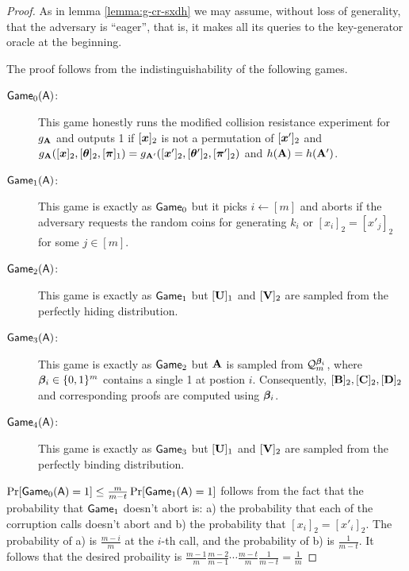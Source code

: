 \begin{proof}
As in lemma \ref{lemma:g-cr-sxdh} we may assume, without loss of generality, that the adversary is ``eager'', that is, it makes all its queries to the key-generator oracle at the beginning.

The proof follows from the indistinguishability of the following games.
\begin{description}
\item[$\mathsf{Game}_0(\mathsf{A})$:] This game honestly runs the modified collision resistance experiment for $g_{\mathbf{{A}}}$ and outputs 1 if $[{\boldsymbol{x}}]_2 $ is not a permutation of $[{\boldsymbol{x}}']_2$ and $g_{\mathbf{{A}}}([{\boldsymbol{x}}]_2,[{\boldsymbol{\theta}}]_2,[{\boldsymbol{\pi}}]_1)=g_{\mathbf{{A}}'}([{\boldsymbol{x}}']_2,[{\boldsymbol{\theta}}']_2,[{\boldsymbol{\pi}}']_2)$ and $h(\mathbf{{A}})=h(\mathbf{{A}}')$.
\item[$\mathsf{Game}_1(\mathsf{A})$:] This game is exactly as $\mathsf{Game}_0$ but it picks $i\gets[m]$ and aborts if the adversary requests the random coins for generating $k_i$ or $[x_i]_2=[x'_j]_2$ for some $j\in[m]$.
\item[$\mathsf{Game}_2(\mathsf{A})$:] This game is exactly as $\mathsf{Game}_1$ but $[\mathbf{{U}}]_1$ and $[\mathbf{{V}}]_2$ are sampled from the perfectly hiding distribution.
\item[$\mathsf{Game}_3(\mathsf{A})$:] This game is exactly as $\mathsf{Game}_2$ but $\mathbf{{A}}$ is sampled from $\mathcal{Q}_m^{{\boldsymbol{\beta}}_i}$, where ${\boldsymbol{\beta}}_i\in\{0,1\}^m$ contains a single 1 at postion $i$. Consequently, $[\mathbf{{B}}]_2,[\mathbf{{C}}]_2,[\mathbf{{D}}]_2$ and corresponding proofs are computed using ${\boldsymbol{\beta}}_i$.
\item[$\mathsf{Game}_4(\mathsf{A})$:] This game is exactly as $\mathsf{Game}_3$ but $[\mathbf{{U}}]_1$ and $[\mathbf{{V}}]_2$ are sampled from the perfectly binding distribution.
\end{description}
$\Pr[\mathsf{Game}_0(\mathsf{A})=1]\leq \frac{m}{m-t}\Pr[\mathsf{Game}_1(\mathsf{A})=1]$  follows from the fact that the probability that $\mathsf{Game}_1$ doesn't abort is: a) the probability that each of the corruption calls doesn't abort and b) the probability that $[x_i]_2=[x'_i]_2$. The probability of a) is $\frac{m-i}{m}$ at the $i$-th call, and the probability of b) is $\frac{1}{m-t}$. It follows that the desired probaility is $\frac{m-1}{m}\frac{m-2}{m-1}\cdots\frac{m-t}{m}\frac{1}{m-t}=\frac{1}{m}$


\end{proof}
